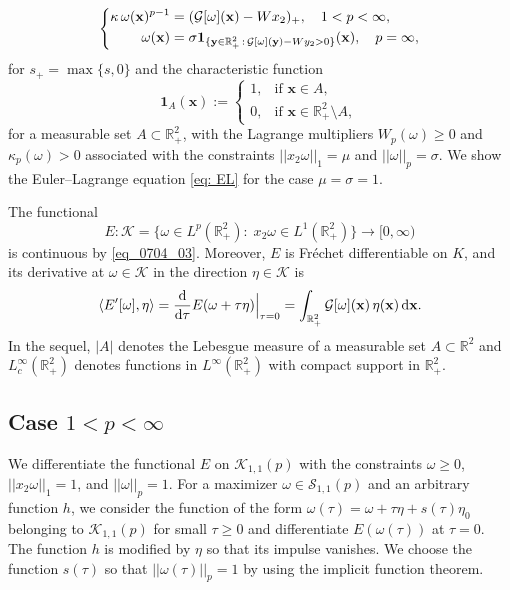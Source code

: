 \documentclass[11pt]{amsart}
\theoremstyle{definition}
\theoremstyle{definition}
\numberwithin{equation}{section}
\newcommand{\0}{\emptyset}
\newcommand{\bfx}{{\bf x}}
\newcommand{\bfy}{{\bf y}}
\newcommand{\bbR}{\mathbb R}
\newcommand{\calG}{\mathcal G}
\newcommand{\calK}{\mathcal K}
\newcommand{\calS}{\mathcal S}
\newcommand{\dd}{\mathrm{d}}
\begin{document}
	\begin{equation}
		\left\{
		\begin{aligned}
			\kappa \, \omega(\bfx)^{p-1}&=(\mathcal{G}[\omega](\bfx)-Wx_2)_{+},\quad 1<p<\infty,\\
			\omega(\bfx)&=\sigma \mathbf{1}_{\{\bfy\in\mathbb{R}^2_+\,:\,\mathcal{G}[\omega](\bfy)-Wy_2>0 \}}(\mathbf{x}),\quad p=\infty, 
		\end{aligned}
		\right.
		\label{eq: EL}
	\end{equation}
	for $s_+= \max\{s, 0\}$ and the characteristic function   
	\[
	\mathbf{1}_A(\mathbf{x}) :=  
	\begin{cases}  
		1, & \text{if } \mathbf{x} \in A, \\  
		0, & \text{if } \mathbf{x} \in \bbR^2_+\setminus A,
	\end{cases}  
	\]
	for a measurable set $A \subset \mathbb{R}^2_+$, with the Lagrange multipliers $W_p(\omega)\geq 0$ and $\kappa_{p}(\omega)>0$ associated with the constraints $||x_2\omega||_1=\mu$ and $||\omega||_{p}=\sigma$. We show the Euler--Lagrange equation \eqref{eq: EL} for the case $\mu=\sigma=1$. 
	
	
	The functional 
	\[
	E: \calK= \{\omega \in L^p(\bbR^2_+): \; x_2\omega \in L^1(\bbR^2_+)\}\to [0,\infty)
	\]
	is continuous by \eqref{eq_0704_03}.
	Moreover, $E$ is Fr\'echet differentiable on $K$, and its derivative at $\omega\in \calK$ in the direction $\eta\in \calK$ is
	\begin{equation}
		\label{eq_derivative}
		\langle E'[\omega],\eta\rangle= \frac{\dd}{\dd\tau}E(\omega+\tau\eta)\Big|_{\tau=0}
		= \int_{\bbR^2_+}\calG[\omega](\bfx)\,\eta(\bfx)\,\dd\bfx.
	\end{equation}
	In the sequel, $|A|$ denotes the Lebesgue measure of a measurable set $A \subset \bbR^2$ and $L^\infty_c(\bbR^2_+)$ denotes functions in $L^\infty(\bbR^2_+)$ with compact support in $\bbR^2_+$.
	
	
	\subsection{Case \texorpdfstring{$1<p<\infty$}{1<p<infinity}}
		
		We differentiate the functional $E$ on $ \calK_{1,1}(p)$ with the constraints $\omega\geq 0$, $||x_2\omega||_{1}=1$, and $||\omega||_{p}=1$. For a maximizer $\omega\in \calS_{1,1}(p)$ and an arbitrary function $h$, we consider the function of the form $\omega(\tau)=\omega+\tau \eta +s(\tau)\eta_0$ belonging to $\calK_{1,1}(p)$ for small $\tau \geq 0$ and differentiate $E(\omega(\tau))$ at $\tau =0$. The function $h$ is modified by $\eta$ so that its impulse vanishes. We choose the function $s(\tau)$ so that $||\omega(\tau)||_{p}=1$ by using the implicit function theorem.
		
\end{document}
